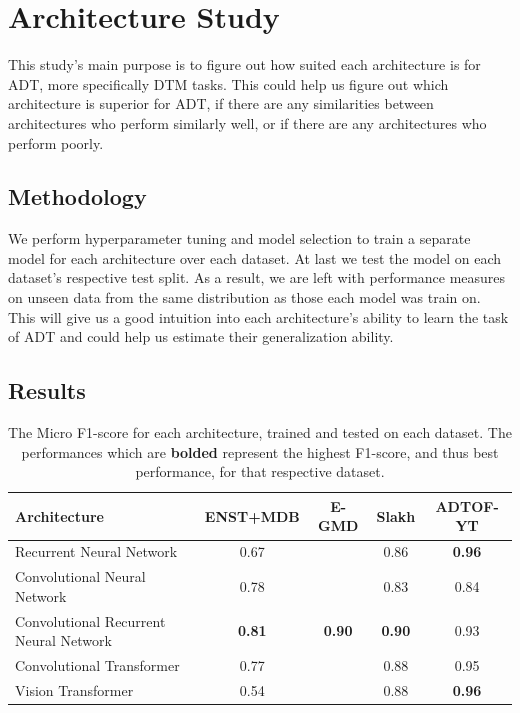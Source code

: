 \chapter{Architecture Study}\label{Study1}

This study's main purpose is to figure out how suited each architecture is for \acrfull{ADT}, more specifically \acrfull{DTM} tasks. This could help us figure out which architecture is superior for \gls{ADT}, if there are any similarities between architectures who perform similarly well, or if there are any architectures who perform poorly.

\section{Methodology}

We perform hyperparameter tuning and model selection to train a separate model for each architecture over each dataset. At last we test the model on each dataset's respective test split. As a result, we are left with performance measures on unseen data from the same distribution as those each model was train on. This will give us a good intuition into each architecture's ability to learn the task of \gls{ADT} and could help us estimate their generalization ability.

\section{Results}	

\begin{table}[H]
    \centering
    \hspace*{-0.6cm}
    \begin{tabular}{l|cccc}
        Architecture & ENST+MDB & E-GMD & Slakh & ADTOF-YT       \\
        \hline
        Recurrent Neural Network	& 0.67 &	 &	0.86 &	\textbf{0.96} \\
        Convolutional Neural Network	& 0.78 &	 &	0.83 &	0.84 \\
        Convolutional Recurrent Neural Network	& \textbf{0.81} &	\textbf{0.90} &	\textbf{0.90} &	0.93 \\
        Convolutional Transformer	& 0.77 &	 &	0.88 &	0.95 \\
        Vision Transformer	& 0.54 &	 &	0.88 &	\textbf{0.96} \\
        
    \end{tabular}
    \caption{The Micro F1-score for each architecture, trained and tested on each dataset. The performances which are \textbf{bolded} represent the highest F1-score, and thus best performance, for that respective dataset.}
    \label{ArchitectureResultsTable}
\end{table}


